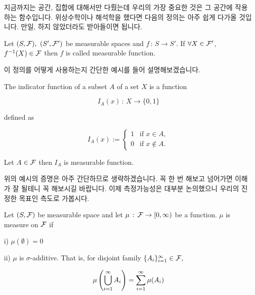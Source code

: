 \documentclass[final]{IEEEphot}
\begin{document}
지금까지는 공간, 집합에 대해서만 다뤘는데 우리의 가장 중요한 것은 그 공간에 작용하는 함수입니다. 위상수학이나 해석학을 했다면 다음의 정의는 아주 쉽게 다가올 것입니다. 만일, 하지 않았더라도 받아들이면 됩니다.

\begin{definition}
 Let $(S, \mathcal{F}),~(S',\mathcal{F}')$ be measurable spaces and $f\,:\,S \rightarrow S'$. If $\forall X \in \mathcal{F}'$, $f^{-1}(X) \in \mathcal{F}$ then $f$ is called measurable function.
 
 \HL
\end{definition}

이 정의를 어떻게 사용하는지 간단한 예시를 들어 설명해보겠습니다.

\begin{definition}
 The indicator function of a subset $A$ of a set $X$ is a function 
 
 \begin{equation*}
    I_A(x)\,:\,X \rightarrow \{0,1\}
 \end{equation*}
 
defined as

\begin{equation*}
 I_A(x) := \begin{cases}1&{\text{if }}x\in A,\\0&{\text{if }}x\notin A.\end{cases}
\end{equation*}

\HL
\end{definition}

\begin{example}
 Let $A \in \mathcal{F}$ then $I_A$ is measurable function.
 
 \HL
\end{example}

 위의 예시의 증명은 아주 간단하므로 생략하겠습니다. 꼭 한 번 해보고 넘어가면 이해가 잘 될테니 꼭 해보시길 바랍니다. 이제 측정가능성은 대부분 논의했으니 우리의 진정한 목표인 측도로 가봅시다.

\newpage

\begin{definition}[Measure]
 Let $(S, \mathcal{F})$ be measurable space and let $\mu\,:\, \mathcal{F} \rightarrow [0,\infty)$ be a function. $\mu$ is measure on $\mathcal{F}$ if
 
 i) $\mu(\emptyset) = 0$
 
 ii) $\mu$ is $\sigma$-additive. That is, for disjoint family $\{A_i\}_{i=1}^\infty \in \mathcal{F}, $
 
 \begin{equation*}
  \mu\left( \bigcup_{i=1}^\infty A_i \right) = \sum_{i=1}^\infty \mu(A_i)
 \end{equation*}

 \HL
\end{definition}
\end{document}
